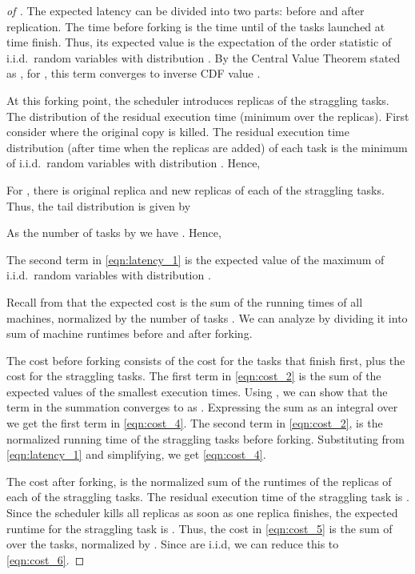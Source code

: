 \begin{proof}[of ]
The expected latency  can be divided into two parts: before and after replication. 
The time before forking  is the time until  of the  tasks launched at time  finish. Thus, its expected value  is the expectation of the  order statistic  of  i.i.d.\ random variables with distribution . By the Central Value Theorem stated as , for , this term converges to inverse CDF value .

At this forking point, the scheduler introduces replicas of the  straggling tasks. The distribution  of the residual execution time (minimum over the  replicas). First consider  where the original copy is killed. The residual execution
time distribution  (after time  when the replicas are added) of each task is the minimum of  i.i.d.\ random variables with distribution . Hence,

For , there is  original replica and  new replicas of each of the straggling tasks. Thus, the tail distribution  is given by

As the number of tasks  by  we have . Hence,

The second term  in \eqref{eqn:latency_1} is the expected value of the maximum of  i.i.d.\ random variables with distribution .

Recall from  that the expected cost  is the sum of the running times of all machines, normalized by the number of tasks . We can analyze  by dividing it into sum of machine runtimes before and after forking.



The cost before forking  consists of the cost for the  tasks that finish first, plus the cost
for the  straggling tasks. The first term in \eqref{eqn:cost_2} is the sum of the expected values of the
smallest  execution times. Using , we can show that the  term in
the summation converges to  as . Expressing the sum as an integral over  we get the first term in \eqref{eqn:cost_4}. The second term in \eqref{eqn:cost_2}, is the normalized
running time of the  straggling tasks before forking. Substituting  from \eqref{eqn:latency_1} and
simplifying, we get \eqref{eqn:cost_4}. 

The cost after forking,  is the normalized sum of the runtimes of the  replicas of each of the
 straggling tasks. The residual execution time of the  straggling task is . Since the
scheduler kills all replicas as soon as one replica finishes, the expected runtime for the  straggling
task is . Thus, the cost in \eqref{eqn:cost_5} is the sum of  over the  tasks,
normalized by . Since  are i.i.d, we can reduce this to \eqref{eqn:cost_6}.
\end{proof}


